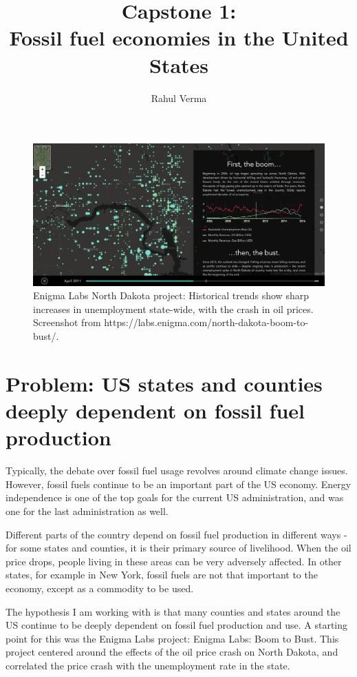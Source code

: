 \documentclass[11pt,letterpaper]{article}
\title{Capstone 1:\\Fossil fuel economies in the United States}
\author{Rahul Verma}
\begin{document}
\graphicspath{{./Images/}}
\maketitle

\begin{figure}
\includegraphics[width=\textwidth]{EnigmaScreenshot}
\caption{Enigma Labs North Dakota project: Historical trends show sharp increases in unemployment state-wide, with the crash in oil prices. Screenshot from https://labs.enigma.com/north-dakota-boom-to-bust/.}
\label{fig:enigma_labs}
\end{figure}

\section{Problem: US states and counties deeply dependent on fossil fuel production}

Typically, the debate over fossil fuel usage revolves around climate change issues. However, fossil fuels continue to be an important part of the US economy. Energy independence is one of the top goals for the current US administration, and was one for the last administration as well. 

Different parts of the country depend on fossil fuel production in different ways - for some states and counties, it is their primary source of livelihood. When the oil price drops, people living in these areas can be very adversely affected. In other states, for example in New York, fossil fuels are not that important to the economy, except as a commodity to be used.

The hypothesis I am working with is that many counties and states around the US continue to be deeply dependent on fossil fuel production and use. A starting point for this was the Enigma Labs project: Enigma Labs: Boom to Bust. This project centered around the effects of the oil price crash on North Dakota, and correlated the price crash with the unemployment rate in the state.
\end{document}
